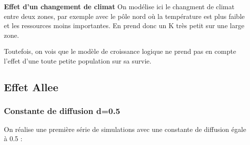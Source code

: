 \documentclass[a4paper,11pt]{article}
\begin{document}
\textbf{Effet d'un changement de climat}
On modélise ici le changment de climat entre deux zones, par exemple avec le pôle nord où la température est plus faible et les ressources moins importantes. En prend donc un K très petit sur une large zone. 





Toutefois, on vois que le modèle de croissance logique ne prend pas en compte l'effet d'une toute petite population sur sa survie. 
\subsection{Effet Allee}

\subsubsection{Constante de diffusion d=0.5}
On réalise une première série de simulations avec une constante de diffusion égale à 0.5 :
\end{document}
